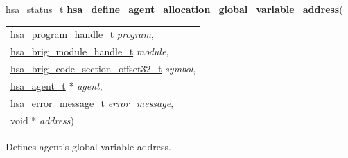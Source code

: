 \documentclass[final]{book}
\newcommand{\hsaarg}[1]{\textit{#1}}
\begin{document}
\begin{appendices}
\noindent\begin{tcolorbox}[breakable,nobeforeafter,colframe=white,colback=lightgray,left=0mm]
\hyperlink{group--status-1gad755322e7ff95456520e8abdbe90d225}{hsa_status_t} \hypertarget{group--HsailLinkerServiceLayer-1ga9568f2d3b8237683531d647a59ea9844}{\textbf{hsa_define_agent_allocation_global_variable_address}}(
\vspace{-3.5mm}\begin{longtable}{@{}p{\textwidth}}
\hspace{1.7em}\hyperlink{group--HsailLinkerServiceLayer-1ga7b28ca39da981be49aac99608eb386cb}{hsa_program_handle_t} \hsaarg{program},\\
\hspace{1.7em}\hyperlink{group--FinalizerCoreApi-1gafaea8b9ab368c499b58375f02f4b178b}{hsa_brig_module_handle_t} \hsaarg{module},\\
\hspace{1.7em}\hyperlink{group--FinalizerCoreApi-1ga975ce5cee53438ed8dc078f3e1dfbc04}{hsa_brig_code_section_offset32_t} \hsaarg{symbol},\\
\hspace{1.7em}\hyperlink{group--topology-1gab8db3fb886332a24acac08ec361e1d86}{hsa_agent_t} * \hsaarg{agent},\\
\hspace{1.7em}\hyperlink{group--FinalizerCoreApi-1ga0105dcb4254850e0ec03d44fc54e11b8}{hsa_error_message_t} \hsaarg{error_message},\\
\hspace{1.7em}void * \hsaarg{address})\end{longtable}

\end{tcolorbox}
Defines agent's global variable address.


\end{appendices}
\end{document}
